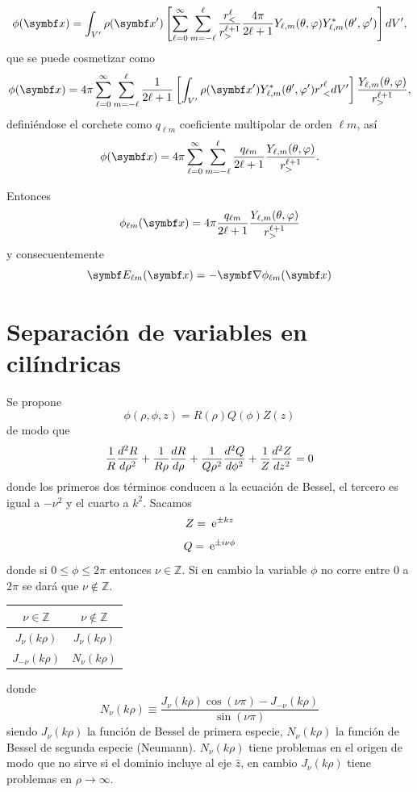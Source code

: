 \documentclass[10pt,oneside]{CBFT_book}
\begin{document}
\[
	\phi(\vb{x})= \int_{V'} \rho(\vb{x}')\left[ \sum_{\ell=0}^\infty \sum_{m=-\ell}^\ell 
	\frac{r_<^\ell}{r_>^{\ell+1}}\frac{4\pi}{2\ell+1} Y_{\ell,m}(\theta,\varphi) 
	Y_{\ell,m}^*(\theta',\varphi')\right] dV',
\]
que se puede cosmetizar como
\[
	\phi(\vb{x})= 4\pi \sum_{\ell=0}^\infty \sum_{m=-\ell}^\ell \frac{1}{2\ell+1} \left[
	\int_{V'} \rho(\vb{x}') Y_{\ell,m}^*(\theta',\varphi') {r'}_<^\ell dV' \right] 
	\frac{Y_{\ell,m}(\theta,\varphi) }{r_>^{\ell+1}},
\]
definiéndose el corchete como $q_{\ell m}$ coeficiente multipolar de orden $\ell m$, así
\[
	\phi(\vb{x})= 4\pi \sum_{\ell=0}^\infty \sum_{m=-\ell}^\ell \frac{q_{\ell m}}{2\ell+1} 
	\frac{Y_{\ell,m}(\theta,\varphi) }{r_>^{\ell+1}}.
\]

Entonces
\[
	\phi_{\ell m}(\vb{x})= 4\pi \frac{q_{\ell m}}{2\ell+1}\frac{Y_{\ell,m}(\theta,\varphi) }{r_>^{\ell+1}}
\]
y consecuentemente
\[
	\vb{E}_{\ell m}(\vb{x}) = - \Nabla \phi_{\ell m}(\vb{x})
\]

\section{Separación de variables en cilíndricas}

Se propone
\[
	\phi(\rho,\phi,z) = R(\rho) Q(\phi) Z(z)
\]
de modo que
\[
	\frac{1}{R} \dtot[2]{R}{\rho} + \frac{1}{R\rho} \dtot{R}{\rho} + \frac{1}{Q\rho^2} \dtot[2]{Q}{\phi} 
				+ \frac{1}{Z} \dtot[2]{Z}{z} = 0
\]
donde los primeros dos términos conducen a la ecuación de Bessel, el tercero es igual a $-\nu^2$ y el
cuarto a $k^2$. Sacamos
\[
	Z = \euler^{\pm kz}
\]
\[
	Q = \euler^{\pm i \nu \phi}
\]
donde si $0\leq \phi \leq 2\pi$ entonces $\nu \in \mathbb{Z}$. Si en cambio la variable $\phi$ no corre 
entre $0$ a $2\pi$ se dará que $\nu \notin \mathbb{Z}$.

\begin{center}
	\begin{tabular}{|c|c|}
	\hline
	$ \nu \in \mathbb{Z} $ & $ \nu \notin \mathbb{Z}  $ \\
	\hline
	$J_\nu(k\rho)$ & $J_\nu(k\rho)$ \\
	$J_{-\nu}(k\rho)$ & $N_\nu(k\rho)$ \\
	\hline
	\end{tabular} 
\end{center}
donde 
\[
	N_\nu(k\rho) \equiv \frac{ J_\nu(k\rho) \cos(\nu\pi) - J_{-\nu}(k\rho)}{\sin(\nu\pi)}
\]
siendo $J_\nu(k\rho)$ la función de Bessel de primera especie, $N_\nu(k\rho)$ la función de Bessel de segunda 
especie (Neumann).
$N_\nu(k\rho)$ tiene problemas en el origen de modo que no sirve si el dominio incluye al eje $\hat{z}$, en 
cambio $J_\nu(k\rho)$ tiene problemas en $\rho\to \infty$.
\end{document}

